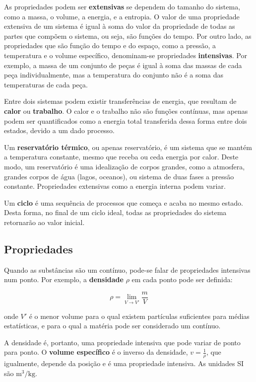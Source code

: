 As propriedades podem ser \textbf{extensivas} se dependem do tamanho do sistema, como a massa, o volume, a energia, e a entropia. O valor de uma propriedade extensiva de um sistema é igual à soma do valor da propriedade de todas as partes que compõem o sistema, ou seja, são funções do tempo. Por outro lado, as propriedades que são função do tempo e do espaço, como a pressão, a temperatura e o volume específico, denominam-se propriedades \textbf{intensivas}. Por exemplo, a massa de um conjunto de peças é igual à soma das massas de cada peça individualmente, mas a temperatura do conjunto não é a soma das temperaturas de cada peça.

Entre dois sistemas podem existir transferências de energia, que resultam de \textbf{calor} ou \textbf{trabalho}. O calor e o trabalho não são funções contínuas, mas apenas podem ser quantificados como a energia total transferida dessa forma entre dois estados, devido a um dado processo.

Um \textbf{reservatório térmico}, ou apenas reservatório, é um sistema que se mantém a temperatura constante, mesmo que receba ou ceda energia por calor. Deste modo, um reservatório é uma idealização de corpos grandes, como a atmosfera, grandes corpos de água (lagos, oceanos), ou sistema de duas fases a pressão constante. Propriedades extensivas como a energia interna podem variar.

Um \textbf{ciclo} é uma sequência de processos que começa e acaba no mesmo estado. Desta forma, no final de um ciclo ideal, todas as propriedades do sistema retornarão ao valor inicial.

\subsection{Propriedades}

Quando as substâncias são um contínuo, pode-se falar de propriedades intensivas num ponto. Por exemplo, a \textbf{densidade} $\rho$ em cada ponto pode ser definida:

\begin{equation}
    \rho = \lim_{V \to V'} \frac{m}{V}
\end{equation}

onde $V'$ é o menor volume para o qual existem partículas suficientes para médias estatísticas, e para o qual a matéria pode ser considerado um contínuo. 

A densidade é, portanto, uma propriedade intensiva que pode variar de ponto para ponto. O \textbf{volume específico} é o inverso da densidade, $v = \frac{1}{\rho}$, que igualmente, depende da posição e é uma propriedade intensiva. As unidades SI são $\text{m}^3 / \text{kg}$.

